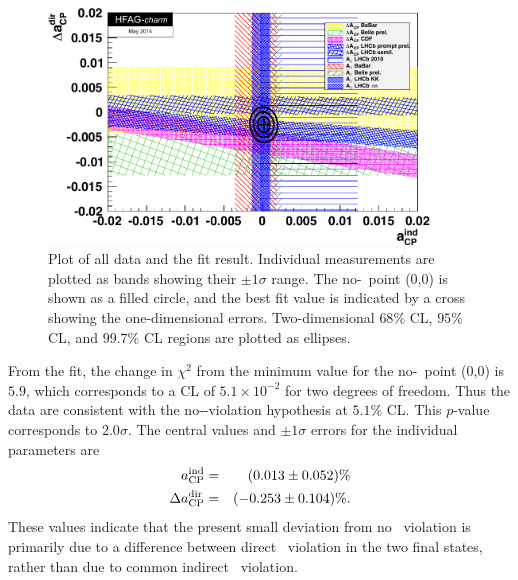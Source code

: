 \begin{figure}
\begin{center}
\includegraphics[width=0.90\textwidth]{figures/charm/deltaACP_AGamma_fit_May14.pdf}
\caption{Plot of all data and the fit result. Individual 
measurements are plotted as bands showing their $\pm1\sigma$ range. 
The no-\cpv\ point (0,0) is shown as a filled circle, and the best 
fit value is indicated by a cross showing the one-dimensional errors. 
Two-dimensional $68\%$ CL, $95\%$ CL, and $99.7\%$ CL regions are 
plotted as ellipses. }
\label{fig:charm:dir_indir_comb}
\end{center}
\end{figure}

From the fit, the change in $\chi^2$ from the minimum value for the no-\cpv\ 
point (0,0) is $5.9$, which corresponds to a CL of $5.1\times 10^{-2}$ for 
two degrees of freedom. Thus the data are consistent with the no-\cp-violation 
hypothesis at $5.1\%$ CL. This $p$-value corresponds to $2.0\sigma$. The central
values and $\pm1\sigma$ errors for the individual parameters are
\begin{eqnarray}
a_{\rm CP}^{\rm ind} & = & (0.013 \pm 0.052 )\% \nonumber\\
\Delta a_{\rm CP}^{\rm dir} & = & (-0.253 \pm 0.104 )\%.
\end{eqnarray}
These values indicate that the present small deviation from 
no \cp\ violation is primarily due to a difference between direct
\cp\ violation in the two final states, rather than due to 
common indirect \cp\ violation.


